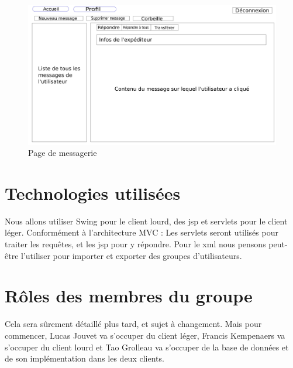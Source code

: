 \documentclass[a4paper, 12pt]{article}
\begin{document}
\begin{figure}[H]
  \begin{center}
    \includegraphics[scale=0.3]{communiquer.png}
  \end{center}
  \caption{Page de messagerie}
\end{figure}

\section{Technologies utilisées}

Nous allons utiliser Swing pour le client lourd, des jsp et servlets pour le client léger. Conformément à l'architecture MVC : Les servlets seront utilisés pour traiter les requêtes, et les jsp pour y répondre. Pour le xml nous pensons peut-être l'utiliser pour importer et exporter des groupes d'utilisateurs.

\section{Rôles des membres du groupe}

Cela sera sûrement détaillé plus tard, et sujet à changement.
Mais pour commencer, Lucas Jouvet va s'occuper du client léger, Francis Kempenaers va s'occuper du client lourd et Tao Grolleau va s'occuper de la base de données et de son implémentation dans les deux clients.
\end{document}

